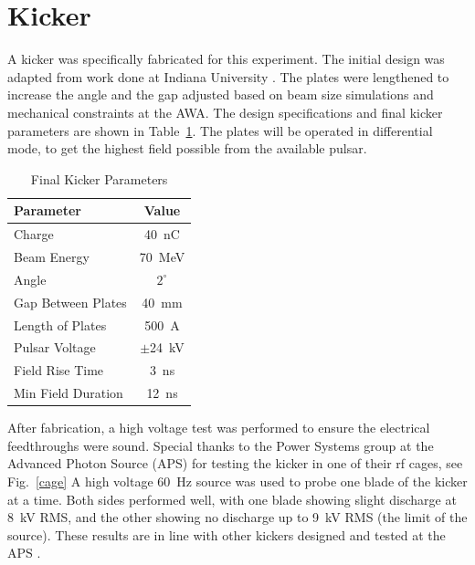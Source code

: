 \documentclass[letterpaper,  %
              ]{jacow-2_3}   %
\begin{document}
\section{Kicker}
A kicker was specifically fabricated 
for this experiment. The initial design was adapted from 
work done at Indiana University \cite{kicker,korea}. The plates were lengthened
to increase the angle and the gap adjusted based on 
beam size simulations and mechanical constraints at the AWA. 
The design specifications and final kicker parameters 
are shown in Table~\ref{tkick}. The plates will be 
operated in differential mode, to get the highest field
possible from the available pulsar.
\begin{table}[hbt]
	\centering
	\caption{Final Kicker Parameters}
	\begin{tabular}{lc}
		\toprule
		\textbf{Parameter} & \textbf{Value} \\
		\midrule
		Charge       		& \SI{40}{nC}   \\ %
		Beam Energy  		& \SI{70}{MeV}  \\ %
		Angle 	     		& $2^{\circ}$ 	\\
		Gap Between Plates  & \SI{40}{mm}	\\		 
		Length of Plates    & \SI{500}{A}	\\
		Pulsar Voltage      & $\pm$\SI{24}{kV} \\
		Field Rise Time  	& \SI{3}{ns}    \\
		Min Field Duration 	& \SI{12}{ns}  \\ %
		\bottomrule
	\end{tabular}
	\label{tkick}
\end{table}

After fabrication, a high voltage test was performed to ensure 
the electrical feedthroughs were sound. Special thanks to 
the Power Systems group at the Advanced Photon Source (APS) for testing 
the kicker in one of their rf cages, see Fig.~\ref{cage}
A high voltage \SI{60}{Hz} 
source was used to probe one blade of the kicker at a time. 
Both sides performed well, with one blade showing slight discharge
at \SI{8}{kV} RMS, and the other showing no discharge up to \SI{9}{kV} RMS
(the limit of the source). These results are in line with other kickers
designed and tested at the APS \cite{mbakicker}.  
\end{document}
